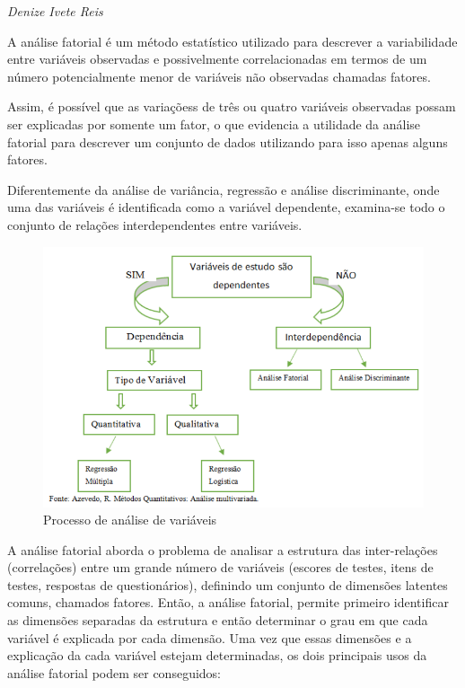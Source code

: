 \documentclass[12pt,brazil,oneside]{book}
\begin{document}
\emph{Denize Ivete Reis}

A análise fatorial é um método estatístico utilizado para descrever a variabilidade entre variáveis observadas e possivelmente correlacionadas em termos de um número potencialmente menor de variáveis não observadas chamadas fatores.

Assim, é possível que as variaçõess de três ou quatro variáveis observadas possam ser explicadas por somente um fator, o que evidencia a utilidade da análise fatorial para descrever um conjunto de dados utilizando para isso apenas alguns fatores.

Diferentemente da análise de variância, regressão e análise discriminante, onde uma das variáveis é identificada como a variável dependente, examina-se todo o conjunto de relações interdependentes entre variáveis.

\begin{figure}[H]

{\centering \includegraphics[width=0.8\linewidth]{anfat1} 

}

\caption{Processo de análise de variáveis}\label{fig:unnamed-chunk-19}
\end{figure}

A análise fatorial aborda o problema de analisar a estrutura das inter-relações (correlações) entre um grande número de variáveis (escores de testes, itens de testes, respostas de questionários), definindo um conjunto de dimensões latentes comuns, chamados fatores. Então, a análise fatorial, permite primeiro identificar as dimensões separadas da estrutura e então determinar o grau em que cada variável é explicada por cada dimensão. Uma vez que essas dimensões e a explicação da cada variável estejam determinadas, os dois principais usos da análise fatorial podem ser conseguidos:
\end{document}
